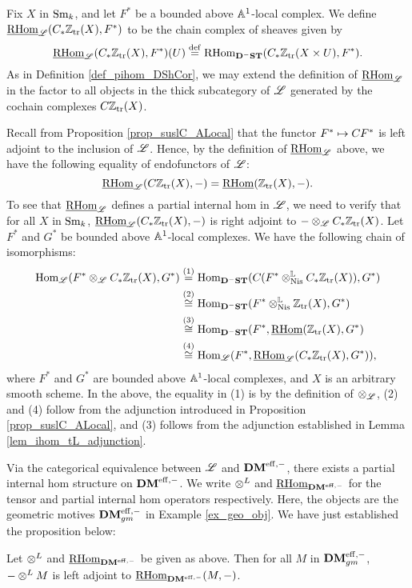 \begin{defn}
Fix $X$ in $\Sm$, and let $F^*$ be a bounded above $\A^1$-local 
complex. We define $\ihomAL(\suslC\Ztr(X), F^*)$ to be the chain
complex of sheaves given by
\[
\ihomAL(\suslC \Ztr(X), F^*)(U) \defeq \rhom_{\DShCor}(\suslC 
   \Ztr(X \times U), F^*).
\]
As in Definition \ref{def_pihom_DShCor}, we may extend the 
definition of $\ihomAL$ in the factor to all objects in the thick 
subcategory of $\ALocal$ generated by the cochain complexes 
$\suslC[]\Ztr(X)$.
\end{defn}
Recall from Proposition \ref{prop_suslC_ALocal} that the functor
$F^* \mapsto \suslC[] F^*$ is left adjoint to the inclusion of
$\ALocal$. Hence, by the definition of $\ihomAL$ above, we have
the following equality of endofunctors of $\ALocal$:
\[
\ihomAL(\suslC[]\Ztr(X), -) = \sheaf{\rhom}(\Ztr(X), -).
\]
To see that $\ihomAL$ defines a partial internal hom in 
$\ALocal$, we need to verify that for all $X$ in $\Sm$,
$\ihomAL(\suslC \Ztr(X), -)$ is right adjoint to
$-\tAL \suslC \Ztr(X)$. Let $F^*$ and $G^*$ be bounded above 
$\A^1$-local complexes. We have the following chain of 
isomorphisms:
\begin{align*}
\hom_{\ALocal}(F^* \tAL \suslC \Ztr(X), G^*) &\stackrel{(1)}{=}
\hom_{\DShCor}(\suslC[](F^* \tLNis \suslC \Ztr(X)), G^*) \\ 
&\stackrel{(2)}{\cong} \hom_{\DShCor}(F^* \tLNis \Ztr(X), G^*) \\
&\stackrel{(3)}{\cong} \hom_{\DShCor}(F^*, \sheaf{\rhom}(\Ztr(X), G^*) \\
&\stackrel{(4)}{\cong} \hom_{\ALocal}(F^*, \ihomAL(\suslC \Ztr(X), G^*)),
\end{align*}
where $F^*$ and $G^*$ are bounded above $\A^1$-local complexes,
and $X$ is an arbitrary smooth scheme. In the above, the 
equality in (1) is by the definition of $\tAL$, (2) and (4) 
follow from the adjunction introduced in Proposition
\ref{prop_suslC_ALocal}, and (3) follows from the adjunction
established in Lemma \ref{lem_ihom_tL_adjunction}. 

Via the categorical equivalence between $\ALocal$ and $\DMeff$,
there exists a partial internal hom structure on $\DMeff$. 
We write $\tDM$ and $\ihomDMf$ for the tensor and
partial internal hom operators respectively. Here, the 
\SemiInvertible objects are the geometric motives $\DMeffgm$ in 
Example \ref{ex_geo_obj}. We have just established the proposition 
below:

\begin{prop}\label{prop_DMgm_monoidal}
Let $\tDM$ and $\ihomDMf$ be given as above. Then for all
$M$ in $\DMeffgm$, $- \tDM M$ is left adjoint to $\ihomDMf(M, -)$.
\end{prop}

